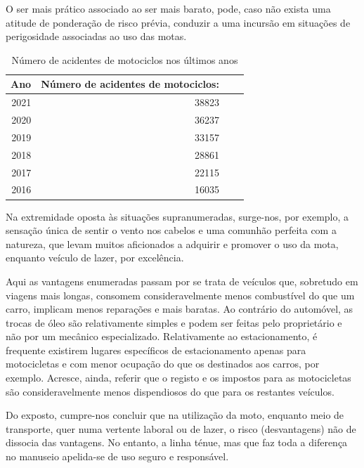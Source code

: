 \documentclass{report}
\begin{document}
O ser mais prático associado ao ser mais barato, pode, caso não exista uma atitude de ponderação de risco prévia, conduzir a uma incursão em situações de perigosidade associadas ao uso das motas.
\begin{table}[h]
\center

\begin{tabular}{r|r |lr}

Ano & Número de acidentes de motociclos:\\ %
\hline                               %
 2021 & 38823 \\
 \hline
 2020 & 36237 \\
 \hline
 2019 & 33157 \\
 \hline 
 2018 & 28861 \\
 \hline 
 2017 & 22115 \\
 \hline
 2016 & 16035 \\

 
\end{tabular}
\caption{Número de acidentes de motociclos nos últimos anos}
\label{tabela}
\end{table}

Na extremidade oposta às situações supranumeradas, surge-nos, por exemplo, a sensação única de sentir o vento nos cabelos e uma comunhão perfeita com a natureza, que levam muitos aficionados a adquirir e promover o uso da mota, enquanto veículo de lazer, por excelência.

Aqui as vantagens enumeradas passam por se trata de veículos que, sobretudo em viagens mais longas, consomem consideravelmente menos combustível do que um carro, implicam menos reparações e mais baratas. Ao contrário do automóvel, as trocas de óleo são relativamente simples e podem ser feitas pelo proprietário e não por um mecânico especializado. Relativamente ao estacionamento, é frequente existirem lugares específicos de estacionamento apenas para motocicletas e com menor ocupação do que os destinados aos carros, por exemplo. Acresce, ainda, referir que o registo e os impostos para as motocicletas são consideravelmente menos dispendiosos do que para os restantes veículos.

Do exposto, cumpre-nos concluir que na utilização da moto, enquanto meio de transporte, quer numa vertente laboral ou de lazer, o risco (desvantagens) não de dissocia das vantagens. No entanto, a linha ténue, mas que faz toda a diferença no manuseio apelida-se de uso seguro e responsável.
\end{document}

